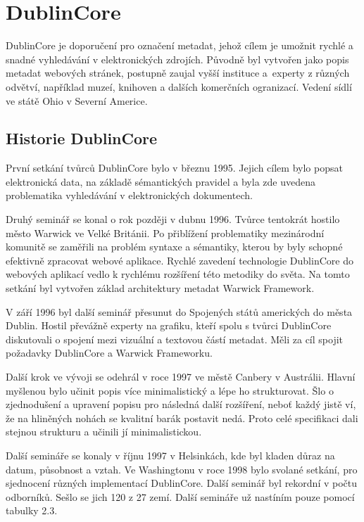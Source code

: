 \section{DublinCore}
\par DublinCore\cite{dublincoredocementation} je doporučení pro označení metadat, jehož cílem je umožnit rychlé a snadné vyhledávání v elektronických zdrojích. Původně byl vytvořen jako popis metadat webových stránek, postupně zaujal vyšší instituce a~experty z různých odvětví, například muzeí, knihoven a dalších komerčních ogranizací. Vedení sídlí ve státě Ohio v Severní Americe.

\subsection{Historie DublinCore}
\par První setkání tvůrců DublinCore\cite{dublincoredocementation} bylo v březnu 1995. Jejich cílem bylo popsat elektronická data, na základě sémantických pravidel a byla zde uvedena problematika vyhledávání v elektronických dokumentech.

\par Druhý seminář se konal o rok později v dubnu 1996. Tvůrce tentokrát hostilo město Warwick ve Velké Británii. Po přiblížení problematiky mezinárodní komunitě se zaměřili na problém syntaxe a sémantiky, kterou by byly schopné efektivně zpracovat webové aplikace. Rychlé zavedení technologie DublinCore do webových aplikací vedlo k rychlému rozšíření této metodiky do světa. Na tomto setkání byl vytvořen základ architektury metadat Warwick Framework.

\par V září 1996 byl další seminář přesunut do Spojených států amerických do města Dublin. Hostil převážně experty na grafiku, kteří spolu s tvůrci DublinCore diskutovali o spojení mezi vizuální a textovou částí metadat. Měli za cíl spojit požadavky DublinCore a Warwick Frameworku.

\par Další krok ve vývoji se odehrál v roce 1997 ve městě Canbery v Austrálii. Hlavní myšlenou bylo učinit popis více minimalistický a lépe ho strukturovat. Šlo o zjednodušení a upravení popisu pro následná další rozšíření, neboť každý jistě ví, že na hliněných nohách se kvalitní barák postavit nedá. Proto celé specifikaci dali stejnou strukturu a učinili jí minimalistickou.

\par Další semináře se konaly v říjnu 1997 v Helsinkách, kde byl kladen důraz na datum, působnost a vztah. Ve Washingtonu v roce 1998 bylo svolané setkání, pro sjednocení různých implementací DublinCore. Další seminář byl rekordní v počtu odborníků. Sešlo se jich 120 z 27 zemí. Další semináře už nastíním pouze pomocí tabulky 2.3.

